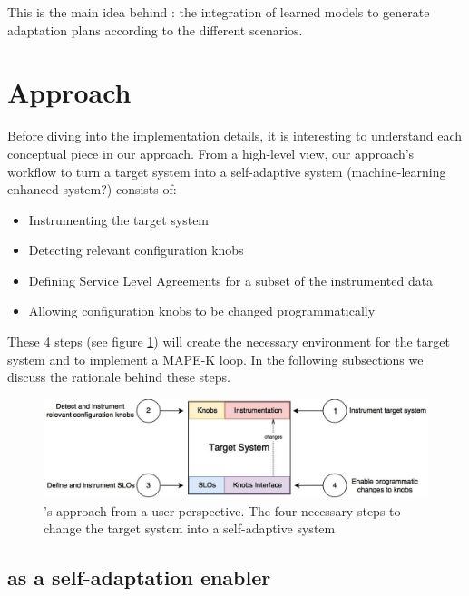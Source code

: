This is the main idea behind \projectname{}: the integration of learned models to generate adaptation plans according to the different scenarios.

\section{Approach}


Before diving into the implementation details, it is interesting to understand each conceptual piece in our approach. From a high-level view, our approach's workflow to turn a target system into a self-adaptive system (machine-learning enhanced system?) consists of:

\begin{itemize}
  \item Instrumenting the target system
  \item Detecting relevant configuration knobs
  \item Defining Service Level Agreements for a subset of the instrumented data
  \item Allowing configuration knobs to be changed programmatically
\end{itemize}

These 4 steps (see figure \ref{fig:finch1}) will create the necessary environment for the target system and \projectname{} to implement a MAPE-K loop. In the following subsections we discuss the rationale behind these steps. 

\begin{figure}[t]
  \includegraphics[width=\textwidth]{images/finch_user_perspective.jpg}
  \caption{\projectname{}'s approach from a user perspective. The four necessary steps to change the target system into a self-adaptive system}
  \label{fig:finch1}
\end{figure}

\subsection{\projectname{} as a self-adaptation enabler}


